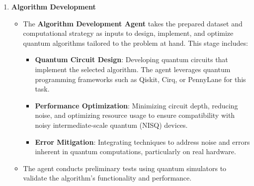 \documentclass[12pt]{article}
\begin{document}
\begin{enumerate}
    \item \textbf{Algorithm Development}
    \begin{itemize}
        \item The \textbf{Algorithm Development Agent} takes the prepared dataset and computational strategy as inputs to design, implement, and optimize quantum algorithms tailored to the problem at hand. This stage includes:
        \begin{itemize}
            \item \textbf{Quantum Circuit Design}: Developing quantum circuits that implement the selected algorithm. The agent leverages quantum programming frameworks such as Qiskit, Cirq, or PennyLane for this task.
            \item \textbf{Performance Optimization}: Minimizing circuit depth, reducing noise, and optimizing resource usage to ensure compatibility with noisy intermediate-scale quantum (NISQ) devices.
            \item \textbf{Error Mitigation}: Integrating techniques to address noise and errors inherent in quantum computations, particularly on real hardware.
        \end{itemize}
        \item The agent conducts preliminary tests using quantum simulators to validate the algorithm’s functionality and performance.
    \end{itemize}


\end{enumerate}
\end{document}
